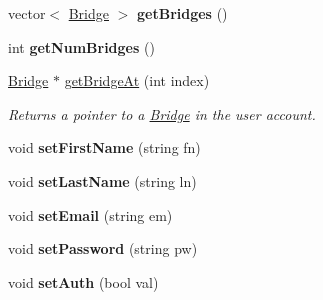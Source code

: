 \begin{DoxyCompactItemize}
\item 
vector$<$ \hyperlink{classBridge}{Bridge} $>$ {\bfseries get\+Bridges} ()\hypertarget{classAccount_a31a506edcb3a47e66b298efeba787964}{}\label{classAccount_a31a506edcb3a47e66b298efeba787964}

\item 
int {\bfseries get\+Num\+Bridges} ()\hypertarget{classAccount_a18278e5f23ae633233fed76370d9c725}{}\label{classAccount_a18278e5f23ae633233fed76370d9c725}

\item 
\hyperlink{classBridge}{Bridge} $\ast$ \hyperlink{classAccount_a99e5b7d9b556d6c61050384a93ddc28f}{get\+Bridge\+At} (int index)
\begin{DoxyCompactList}\small\item\em Returns a pointer to a \hyperlink{classBridge}{Bridge} in the user account. \end{DoxyCompactList}\item 
void {\bfseries set\+First\+Name} (string fn)\hypertarget{classAccount_a0b85870f9800bfe8511bdf29e7bf8401}{}\label{classAccount_a0b85870f9800bfe8511bdf29e7bf8401}

\item 
void {\bfseries set\+Last\+Name} (string ln)\hypertarget{classAccount_afae856e8a22f025e49eb67b1d1a44ece}{}\label{classAccount_afae856e8a22f025e49eb67b1d1a44ece}

\item 
void {\bfseries set\+Email} (string em)\hypertarget{classAccount_acb2250a8de021ec3623e022ba15eba98}{}\label{classAccount_acb2250a8de021ec3623e022ba15eba98}

\item 
void {\bfseries set\+Password} (string pw)\hypertarget{classAccount_ab1527d71089a635948c59fdc815797ca}{}\label{classAccount_ab1527d71089a635948c59fdc815797ca}

\item 
void {\bfseries set\+Auth} (bool val)\hypertarget{classAccount_a073cd6a4b7282e142e7e0ce51af5336a}{}\label{classAccount_a073cd6a4b7282e142e7e0ce51af5336a}


\end{DoxyCompactItemize}
